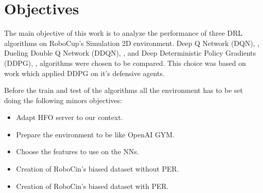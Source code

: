 \chapter{Objectives}
The main objective of this work is to analyze the performance of three DRL algorithms on RoboCup's Simulation 2D environment. Deep Q Network (DQN), \cite{dqn}, Dueling Double Q Network (DDQN), \cite{DDQN}, and Deep Deterministic Policy Gradients (DDPG), \cite{DDPG}, algorithms were chosen to be compared. This choice was based on \cite{cyrus} work which applied DDPG on it's defensive agents.

Before the train and test of the algorithms all the environment has to be set doing the following minors objectives:
\begin{itemize}
    \item Adapt HFO server to our context.
    \item Prepare the environment to be like OpenAI GYM.
    \item Choose the features to use on the NNs.
    \item Creation of RoboCin's biased dataset without PER.
    \item Creation of RoboCin's biased dataset with PER.
\end{itemize}